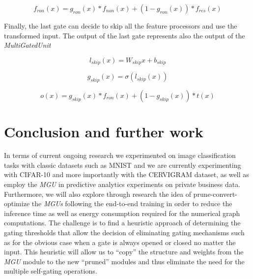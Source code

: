 \documentclass[conference]{IEEEtran}
\begin{document}
\begin{equation}
f_{ron}(x) = g_{ron}(x) * f_{non}(x) + (1-g_{ron}(x)) * f_{res}(x)
\end{equation}

Finally, the last gate can decide to skip all the feature processors and use the transformed input. The output of the last gate represents also the output of the \textit{MultiGatedUnit}

\begin{equation}
l_{skip}(x) = W_{skip}x + b_{skip}
\end{equation}

\begin{equation}
g_{skip}(x) = \sigma(l_{skip}(x))
\end{equation}

\begin{equation}
o(x) = g_{skip}(x) * f_{ron}(x) + (1-g_{skip}(x)) * t(x)
\end{equation}



\section{Conclusion and further work}

In terms of current ongoing research we experimented on image classification tasks with classic datasets such as MNIST and we are currently experimenting with CIFAR-10 and more importantly with the CERVIGRAM \cite{xu2015new} dataset, as well as employ the \textit{MGU} in predictive analytics experiments on private business data. Furthermore, we will also explore through research the idea of prune-convert-optimize the \textit{MGUs} following the end-to-end training in order to reduce the inference time as well as energy consumption required for the numerical graph computations. The challenge is to find a heuristic approach of determining the gating thresholds that allow the decision of eliminating gating mechanisms such as for the obvious case when a gate is always opened or closed no matter the input. This heuristic will allow us to “copy” the structure and weights from the \textit{MGU} module to the new “pruned” modules and thus eliminate the need for the multiple self-gating operations.
\end{document}
